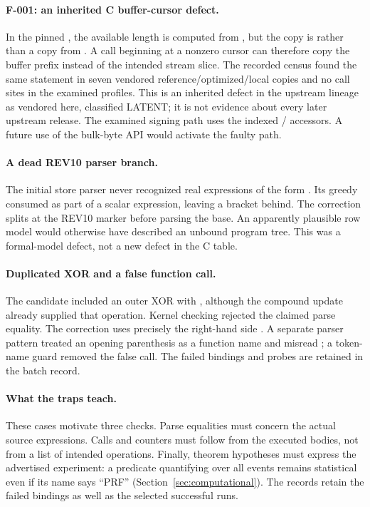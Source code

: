 \paragraph{F-001: an inherited C buffer-cursor defect.}
In the pinned , the available length is
computed from , but the copy is
 rather than a copy from
. A call beginning at a nonzero cursor can
therefore copy the buffer prefix instead of the intended stream slice.
The recorded census found the same statement in seven vendored
reference/optimized/local copies and no call sites in the examined
profiles. This is an inherited defect in the upstream lineage as
vendored here, classified LATENT; it is not evidence about every later
upstream release. The examined signing path uses the indexed
/ accessors. A future use of the bulk-byte
API would activate the faulty path.

\paragraph{A dead REV10 parser branch.}
The initial store parser never recognized real expressions of the form
. Its greedy  consumed
 as part of a scalar expression, leaving a bracket behind.
The correction splits at the REV10 marker before parsing the base.
An apparently plausible row model would otherwise have described an
unbound program tree. This was a formal-model defect, not a new defect
in the C table.

\paragraph{Duplicated XOR and a false function call.}
The candidate  included an outer XOR with ,
although the compound update  already supplied that
operation. Kernel checking rejected the claimed parse equality.
The correction uses precisely the right-hand side
.
A separate parser pattern treated an opening parenthesis as a function
name and misread ; a token-name guard removed
the false call. The failed bindings and probes are retained in the
batch record.

\paragraph{What the traps teach.}
These cases motivate three checks. Parse equalities must concern the
actual source expressions. Calls and counters must follow from the
executed bodies, not from a list of intended operations. Finally,
theorem hypotheses must express the advertised experiment: a predicate
quantifying over all events remains statistical even if its name says
``PRF'' (Section~\ref{sec:computational}). The records retain the failed
bindings as well as the selected successful runs.

